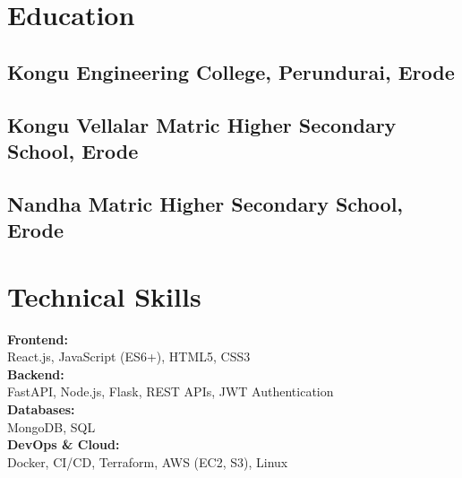 \documentclass[]{plushcv}
\begin{document}
\hfill
\begin{minipage}[t]{0.25\textwidth} 

\section{Education} 

\subsection{Kongu Engineering College, Perundurai, Erode}
\sectionsep

\subsection{Kongu Vellalar Matric Higher Secondary School, Erode}
\sectionsep

\subsection{Nandha Matric Higher Secondary School, Erode}
\sectionsep


\section{Technical Skills}

\textbf{Frontend:}\\
React.js, JavaScript (ES6+), HTML5, CSS3 \\[4pt]

\textbf{Backend:}\\
FastAPI, Node.js, Flask, REST APIs, JWT Authentication \\[4pt]

\textbf{Databases:}\\
MongoDB, SQL \\[4pt]

\textbf{DevOps \& Cloud:}\\
Docker, CI/CD, Terraform, AWS (EC2, S3), Linux \\[4pt]


\end{minipage}
\end{document}
